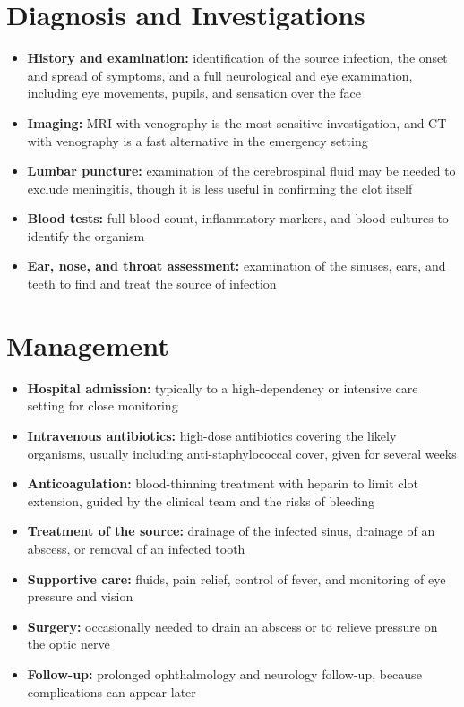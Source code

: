 \section*{Diagnosis and Investigations}
\begin{itemize}
    \item \textbf{History and examination:} identification of the source infection, the onset and spread of symptoms, and a full neurological and eye examination, including eye movements, pupils, and sensation over the face
    \item \textbf{Imaging:} MRI with venography is the most sensitive investigation, and CT with venography is a fast alternative in the emergency setting
    \item \textbf{Lumbar puncture:} examination of the cerebrospinal fluid may be needed to exclude meningitis, though it is less useful in confirming the clot itself
    \item \textbf{Blood tests:} full blood count, inflammatory markers, and blood cultures to identify the organism
    \item \textbf{Ear, nose, and throat assessment:} examination of the sinuses, ears, and teeth to find and treat the source of infection
\end{itemize}

\section*{Management}
\begin{itemize}
    \item \textbf{Hospital admission:} typically to a high-dependency or intensive care setting for close monitoring
    \item \textbf{Intravenous antibiotics:} high-dose antibiotics covering the likely organisms, usually including anti-staphylococcal cover, given for several weeks
    \item \textbf{Anticoagulation:} blood-thinning treatment with heparin to limit clot extension, guided by the clinical team and the risks of bleeding
    \item \textbf{Treatment of the source:} drainage of the infected sinus, drainage of an abscess, or removal of an infected tooth
    \item \textbf{Supportive care:} fluids, pain relief, control of fever, and monitoring of eye pressure and vision
    \item \textbf{Surgery:} occasionally needed to drain an abscess or to relieve pressure on the optic nerve
    \item \textbf{Follow-up:} prolonged ophthalmology and neurology follow-up, because complications can appear later
\end{itemize}

